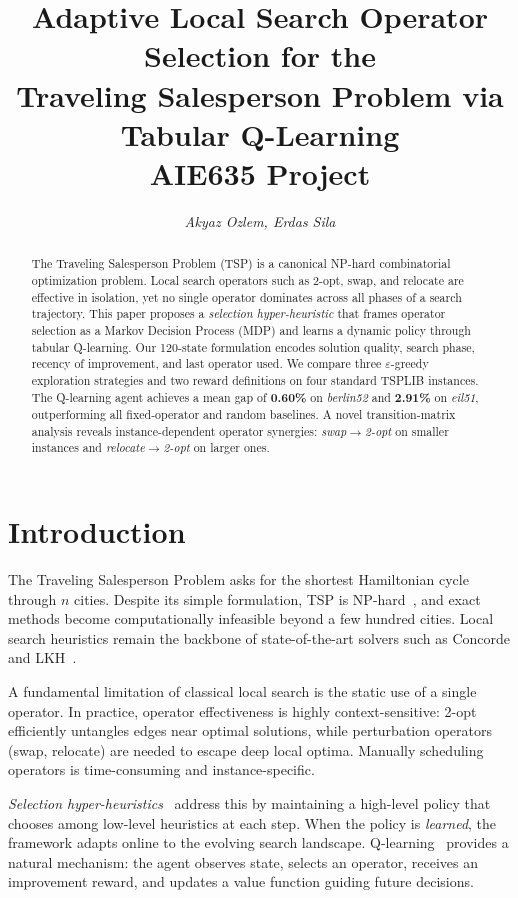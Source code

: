 \documentclass[10pt,twocolumn]{article}
\title{\textbf{Adaptive Local Search Operator Selection for the\\
Traveling Salesperson Problem via Tabular Q-Learning \\AIE635 Project}}
\author{\textit{Akyaz Ozlem, Erdas Sila}}
\date{}
\begin{document}
\maketitle

\begin{abstract}
The Traveling Salesperson Problem (TSP) is a canonical NP-hard combinatorial
optimization problem. Local search operators such as 2-opt, swap, and relocate
are effective in isolation, yet no single operator dominates across all phases
of a search trajectory. This paper proposes a \emph{selection hyper-heuristic}
that frames operator selection as a Markov Decision Process (MDP) and learns a
dynamic policy through tabular Q-learning. Our 120-state formulation encodes
solution quality, search phase, recency of improvement, and last operator used.
We compare three $\varepsilon$-greedy exploration strategies and two reward
definitions on four standard TSPLIB instances. The Q-learning agent achieves
a mean gap of \textbf{0.60\%} on \textit{berlin52} and \textbf{2.91\%} on
\textit{eil51}, outperforming all fixed-operator and random baselines. A novel
transition-matrix analysis reveals instance-dependent operator synergies:
\emph{swap}$\to$\emph{2-opt} on smaller instances and
\emph{relocate}$\to$\emph{2-opt} on larger ones.
\end{abstract}

\section{Introduction}

The Traveling Salesperson Problem asks for the shortest Hamiltonian cycle
through $n$ cities. Despite its simple formulation, TSP is NP-hard~\cite{garey79},
and exact methods become computationally infeasible beyond a few hundred cities.
Local search heuristics remain the backbone of state-of-the-art solvers such as
Concorde and LKH~\cite{applegate06,helsgott00}.

A fundamental limitation of classical local search is the static use of a
single operator. In practice, operator effectiveness is highly context-sensitive:
2-opt efficiently untangles edges near optimal solutions, while perturbation
operators (swap, relocate) are needed to escape deep local optima. Manually
scheduling operators is time-consuming and instance-specific.

\emph{Selection hyper-heuristics}~\cite{burke10} address this by maintaining a
high-level policy that chooses among low-level heuristics at each step. When
the policy is \emph{learned}, the framework adapts online to the evolving
search landscape. Q-learning~\cite{watkins92} provides a natural mechanism:
the agent observes state, selects an operator, receives an improvement reward,
and updates a value function guiding future decisions.
\end{document}
